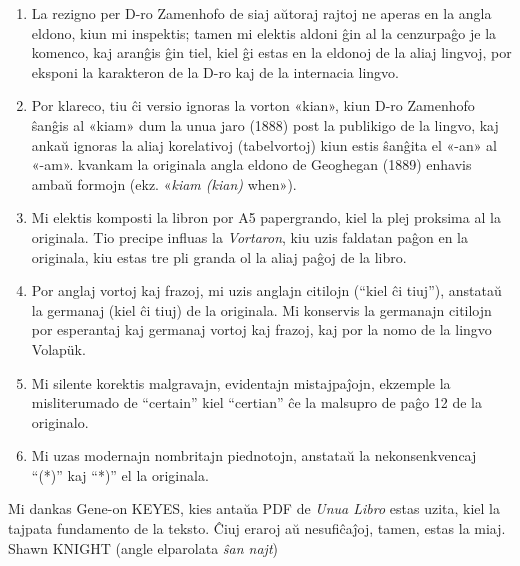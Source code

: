 \documentclass[12pt,twoside]{book}
\begin{document}
\begin{enumerate}

\item La rezigno per D-ro Zamenhofo de siaj aŭtoraj rajtoj ne aperas en la angla eldono, kiun mi inspektis; tamen mi elektis aldoni ĝin al la cenzurpaĝo je la komenco, kaj aranĝis ĝin tiel, kiel ĝi estas en la eldonoj de la aliaj lingvoj, por eksponi la karakteron de la D-ro kaj de la internacia lingvo.

\item Por klareco, tiu ĉi versio ignoras la vorton «kian», kiun D-ro Zamenhofo ŝanĝis al «kiam» dum la unua jaro (1888) post la publikigo de la lingvo, kaj ankaŭ ignoras la aliaj korelativoj (tabelvortoj) kiun estis ŝanĝita el «-an» al «-am». kvankam la originala angla eldono de Geoghegan (1889) enhavis ambaŭ formojn (ekz. «\emph{kiam (kian)} when»).

\item Mi elektis komposti la libron por A5 papergrando, kiel la plej proksima al la originala.  Tio precipe influas la \emph{Vortaron}, kiu uzis faldatan paĝon en la originala, kiu estas tre pli granda ol la aliaj paĝoj de la libro.

\item Por anglaj vortoj kaj frazoj, mi uzis anglajn citilojn (``kiel ĉi tiuj''), anstataŭ la germanaj (\glqq{}kiel ĉi tiuj\grqq{}) de la originala.  Mi konservis la germanajn citilojn por esperantaj kaj germanaj vortoj kaj frazoj, kaj por la nomo de la lingvo Volap\"{u}k.

\item Mi silente korektis malgravajn, evidentajn mistajpaĵojn, ekzemple la misliterumado de ``certain'' kiel ``certian'' ĉe la malsupro de paĝo 12 de la originalo.

\item Mi uzas modernajn nombritajn piednotojn, anstataŭ la nekonsenkvencaj ``(*)'' kaj ``*)'' el la originala.

\end{enumerate}

Mi dankas Gene-on KEYES, kies antaŭa PDF de \emph{Unua Libro} estas uzita, kiel la tajpata fundamento de la teksto.  Ĉiuj eraroj aŭ nesufiĉaĵoj, tamen, estas la miaj.\\[1ex]

{\setlength{\parindent}{0em}
Shawn KNIGHT (angle elparolata \emph{ŝan najt})\\
\hodiau}


\end{document}
